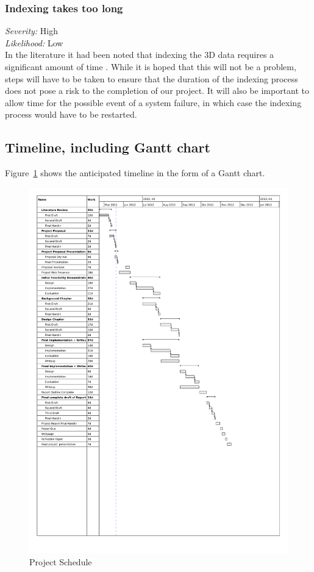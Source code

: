 \documentclass[12pt,a4paper]{article}
\begin{document}
\subsubsection*{Indexing takes too long}
\noindent \textit{Severity: } High \\
\noindent \textit{Likelihood: } Low \\
In the literature it had been noted that indexing the 3D data requires a significant
amount of time \cite{interactivepointclouds}. While it is hoped that this will not be
a problem, steps will have to be taken to ensure that the duration of the indexing
process does not pose a risk to the completion of our project. It will also be important
to allow time for the possible event of a system failure, in which case the indexing
process would have to be restarted.
\subsection{Timeline, including Gantt chart}
Figure~\ref{gant} shows the anticipated timeline in the form of a Gantt chart.
\begin{figure}[h!]
\centering
    \includegraphics[width=1\textwidth]{gantt1.pdf}
    \caption{Project Schedule}
    \label{gant}
\end{figure}
\end{document}
